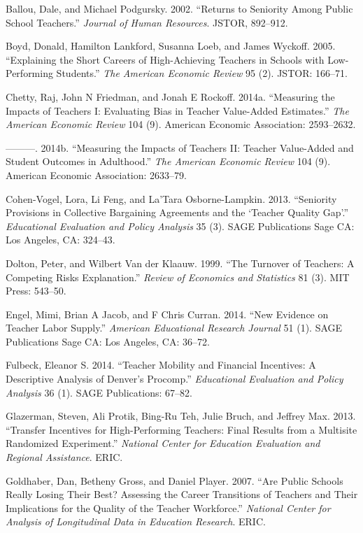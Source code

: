 \documentclass[]{article}
\begin{document}
\hypertarget{ref-ballou}{}
Ballou, Dale, and Michael Podgursky. 2002. ``Returns to Seniority Among
Public School Teachers.'' \emph{Journal of Human Resources}. JSTOR,
892--912.

\hypertarget{ref-boyd}{}
Boyd, Donald, Hamilton Lankford, Susanna Loeb, and James Wyckoff. 2005.
``Explaining the Short Careers of High-Achieving Teachers in Schools
with Low-Performing Students.'' \emph{The American Economic Review} 95
(2). JSTOR: 166--71.

\hypertarget{ref-chettyI}{}
Chetty, Raj, John N Friedman, and Jonah E Rockoff. 2014a. ``Measuring
the Impacts of Teachers I: Evaluating Bias in Teacher Value-Added
Estimates.'' \emph{The American Economic Review} 104 (9). American
Economic Association: 2593--2632.

\hypertarget{ref-chettyII}{}
---------. 2014b. ``Measuring the Impacts of Teachers II: Teacher
Value-Added and Student Outcomes in Adulthood.'' \emph{The American
Economic Review} 104 (9). American Economic Association: 2633--79.

\hypertarget{ref-cohenvogel}{}
Cohen-Vogel, Lora, Li Feng, and La'Tara Osborne-Lampkin. 2013.
``Seniority Provisions in Collective Bargaining Agreements and the
`Teacher Quality Gap'.'' \emph{Educational Evaluation and Policy
Analysis} 35 (3). SAGE Publications Sage CA: Los Angeles, CA: 324--43.

\hypertarget{ref-dolton}{}
Dolton, Peter, and Wilbert Van der Klaauw. 1999. ``The Turnover of
Teachers: A Competing Risks Explanation.'' \emph{Review of Economics and
Statistics} 81 (3). MIT Press: 543--50.

\hypertarget{ref-engel}{}
Engel, Mimi, Brian A Jacob, and F Chris Curran. 2014. ``New Evidence on
Teacher Labor Supply.'' \emph{American Educational Research Journal} 51
(1). SAGE Publications Sage CA: Los Angeles, CA: 36--72.

\hypertarget{ref-fulbeck}{}
Fulbeck, Eleanor S. 2014. ``Teacher Mobility and Financial Incentives: A
Descriptive Analysis of Denver's Procomp.'' \emph{Educational Evaluation
and Policy Analysis} 36 (1). SAGE Publications: 67--82.

\hypertarget{ref-glazerman}{}
Glazerman, Steven, Ali Protik, Bing-Ru Teh, Julie Bruch, and Jeffrey
Max. 2013. ``Transfer Incentives for High-Performing Teachers: Final
Results from a Multisite Randomized Experiment.'' \emph{National Center
for Education Evaluation and Regional Assistance}. ERIC.

\hypertarget{ref-goldhaber2007}{}
Goldhaber, Dan, Betheny Gross, and Daniel Player. 2007. ``Are Public
Schools Really Losing Their Best? Assessing the Career Transitions of
Teachers and Their Implications for the Quality of the Teacher
Workforce.'' \emph{National Center for Analysis of Longitudinal Data in
Education Research}. ERIC.
\end{document}
